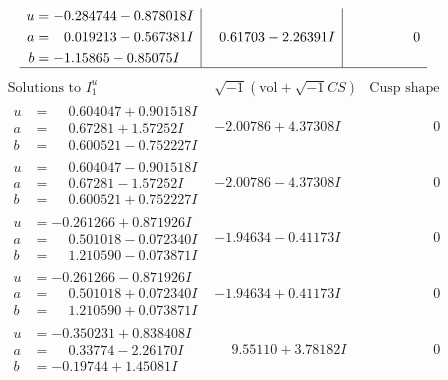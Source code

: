 \documentclass[1p]{elsarticle_modified}
\theoremstyle{definition}
\newcommand{\I}{\sqrt{-1}}
\begin{document}
$$\begin{array}{c|c|c}
\begin{aligned}
u &= -0.284744 - 0.878018 I \\
a &= \phantom{-}0.019213 - 0.567381 I \\
b &= -1.15865 - 0.85075 I\end{aligned}
 & \phantom{-}0.61703 - 2.26391 I & \phantom{-0.000000 } 0\\
 \hline 
 \end{array}$$\newpage$$\begin{array}{c|c|c}  
\text{Solutions to }I^u_{1}& \I (\text{vol} + \sqrt{-1}CS) & \text{Cusp shape}\\
 \hline 
\begin{aligned}
u &= \phantom{-}0.604047 + 0.901518 I \\
a &= \phantom{-}0.67281 + 1.57252 I \\
b &= \phantom{-}0.600521 - 0.752227 I\end{aligned}
 & -2.00786 + 4.37308 I & \phantom{-0.000000 } 0 \\ \hline\begin{aligned}
u &= \phantom{-}0.604047 - 0.901518 I \\
a &= \phantom{-}0.67281 - 1.57252 I \\
b &= \phantom{-}0.600521 + 0.752227 I\end{aligned}
 & -2.00786 - 4.37308 I & \phantom{-0.000000 } 0 \\ \hline\begin{aligned}
u &= -0.261266 + 0.871926 I \\
a &= \phantom{-}0.501018 - 0.072340 I \\
b &= \phantom{-}1.210590 - 0.073871 I\end{aligned}
 & -1.94634 - 0.41173 I & \phantom{-0.000000 } 0 \\ \hline\begin{aligned}
u &= -0.261266 - 0.871926 I \\
a &= \phantom{-}0.501018 + 0.072340 I \\
b &= \phantom{-}1.210590 + 0.073871 I\end{aligned}
 & -1.94634 + 0.41173 I & \phantom{-0.000000 } 0 \\ \hline\begin{aligned}
u &= -0.350231 + 0.838408 I \\
a &= \phantom{-}0.33774 - 2.26170 I \\
b &= -0.19744 + 1.45081 I\end{aligned}
 & \phantom{-}9.55110 + 3.78182 I & \phantom{-0.000000 } 0 \\ \hline\begin{aligned}

\end{aligned}
\end{array}$$
\end{document}
